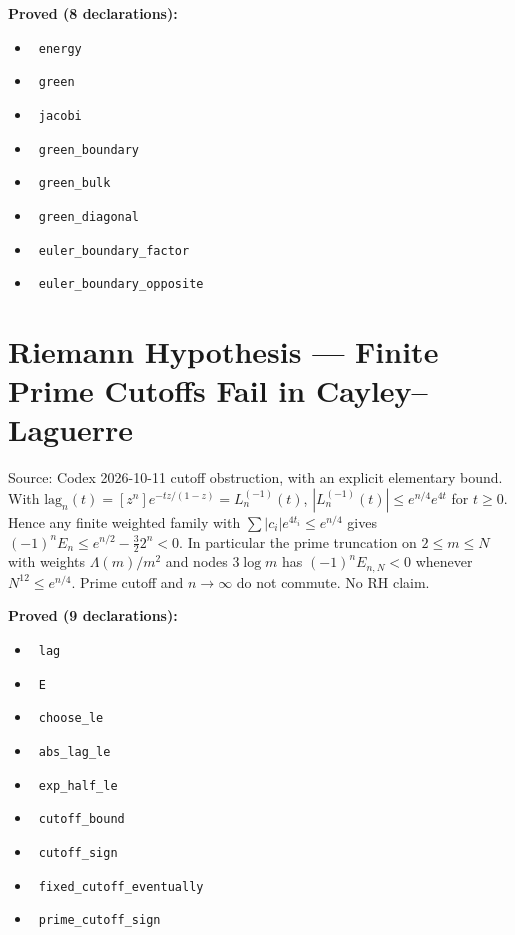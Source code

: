 \documentclass{report}
\theoremstyle{definition}
\begin{document}
\noindent\textbf{Proved (8 declarations):}
\begin{itemize}
  \item {}\leanok\ \texttt{energy}
  \item {}\leanok\ \texttt{green}
  \item {}\leanok\ \texttt{jacobi}
  \item {}\leanok\ \texttt{green\_boundary}
  \item {}\leanok\ \texttt{green\_bulk}
  \item {}\leanok\ \texttt{green\_diagonal}
  \item {}\leanok\ \texttt{euler\_boundary\_factor}
  \item {}\leanok\ \texttt{euler\_boundary\_opposite}
\end{itemize}

\section{Riemann Hypothesis --- Finite Prime Cutoffs Fail in Cayley–Laguerre}
Source: Codex 2026-10-11 cutoff obstruction, with an explicit elementary bound. With $\mathrm{lag}_n(t)=[z^n]e^{-tz/(1-z)}=L_n^{(-1)}(t)$, $|L_n^{(-1)}(t)|\le e^{n/4}e^{4t}$ for $t\ge0$. Hence any finite weighted family with $\sum|c_i|e^{4t_i}\le e^{n/4}$ gives $(-1)^nE_n\le e^{n/2}-\tfrac32 2^n<0$. In particular the prime truncation on $2\le m\le N$ with weights $\Lambda(m)/m^2$ and nodes $3\log m$ has $(-1)^nE_{n,N}<0$ whenever $N^{12}\le e^{n/4}$. Prime cutoff and $n\to\infty$ do not commute. No RH claim.

\noindent\textbf{Proved (9 declarations):}
\begin{itemize}
  \item {}\leanok\ \texttt{lag}
  \item {}\leanok\ \texttt{E}
  \item {}\leanok\ \texttt{choose\_le}
  \item {}\leanok\ \texttt{abs\_lag\_le}
  \item {}\leanok\ \texttt{exp\_half\_le}
  \item {}\leanok\ \texttt{cutoff\_bound}
  \item {}\leanok\ \texttt{cutoff\_sign}
  \item {}\leanok\ \texttt{fixed\_cutoff\_eventually}
  \item {}\leanok\ \texttt{prime\_cutoff\_sign}
\end{itemize}
\end{document}
